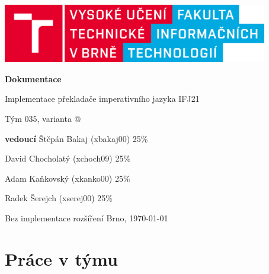 \documentclass[a4paper, 12pt]{article}
\makeatletter
\newcommand*{\rom}[1]{\expandafter\@slowromancap\romannumeral #1@}
\makeatother
\begin{document}
    \begin{titlepage}
        \begin{center}
            \includegraphics[width=0.87\textwidth]{images/logo_cz.png}
            \vspace*{6cm}

            \Huge{\textbf{Dokumentace}}
            \vspace{0.5cm}
            
            \LARGE{Implementace překladače imperativního jazyka IFJ21}
            \vspace{0.5cm}
            
            \Large{Tým 035, varianta \rom{1}}
            \vspace{2.5cm}
            
            \large{\textbf{vedoucí} Štěpán Bakaj (xbakaj00) 25\%}
            \vspace{0.1cm}
            
            \large{David Chocholatý (xchoch09) 25\%}
            \vspace{0.1cm}
            
            \large{Adam Kaňkovský (xkanko00) 25\%}
            \vspace{0.1cm}
            
            \large{Radek Šerejch (xserej00) 25\%}
            \vspace{0.1cm}
            
           \vfill
		   \begin{flushleft} 
		   \large
		   Bez implementace rozšíření
		   \hfill
		   Brno, \today
		   \end{flushleft}
        \end{center}
    \end{titlepage}

\pagestyle{fancy}

\newpage
\tableofcontents
\newpage

\section{Práce v týmu}
\end{document}
